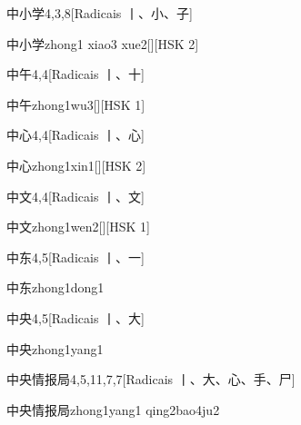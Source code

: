 \begin{entry}{中小学}{4,3,8}[Radicais ⼁、⼩、⼦]
  \begin{phonetics}{中小学}{zhong1 xiao3 xue2}[][HSK 2]
  \end{phonetics}
\end{entry}

\begin{entry}{中午}{4,4}[Radicais ⼁、⼗]
  \begin{phonetics}{中午}{zhong1wu3}[][HSK 1]
  \end{phonetics}
\end{entry}

\begin{entry}{中心}{4,4}[Radicais ⼁、⼼]
  \begin{phonetics}{中心}{zhong1xin1}[][HSK 2]
  \end{phonetics}
\end{entry}

\begin{entry}{中文}{4,4}[Radicais ⼁、⽂]
  \begin{phonetics}{中文}{zhong1wen2}[][HSK 1]
  \end{phonetics}
\end{entry}

\begin{entry}{中东}{4,5}[Radicais ⼁、⼀]
  \begin{phonetics}{中东}{zhong1dong1}
  \end{phonetics}
\end{entry}

\begin{entry}{中央}{4,5}[Radicais ⼁、⼤]
  \begin{phonetics}{中央}{zhong1yang1}
  \end{phonetics}
\end{entry}

\begin{entry}{中央情报局}{4,5,11,7,7}[Radicais ⼁、⼤、⼼、⼿、⼫]
  \begin{phonetics}{中央情报局}{zhong1yang1 qing2bao4ju2}
  \end{phonetics}
\end{entry}

